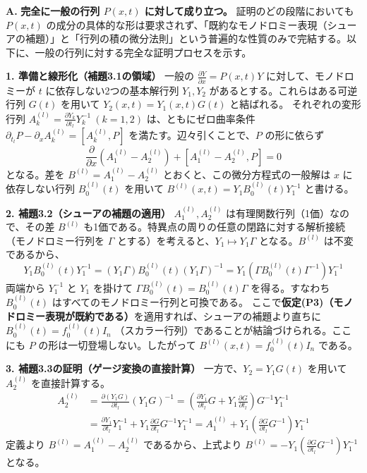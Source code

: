 \begin{Q}
\textbf{A.} \textbf{完全に一般の行列 $P(x,t)$ に対して成り立つ。}
証明のどの段階においても $P(x,t)$ の成分の具体的な形は要求されず、「既約なモノドロミー表現（シューアの補題）」と「行列の積の微分法則」という普遍的な性質のみで完結する。以下に、一般の行列に対する完全な証明プロセスを示す。

\textbf{1. 準備と線形化（補題3.1の領域）}
一般の $\frac{\partial Y}{\partial x} = P(x,t)Y$ に対して、モノドロミーが $t$ に依存しない2つの基本解行列 $Y_1, Y_2$ があるとする。これらはある可逆行列 $G(t)$ を用いて $Y_2(x,t) = Y_1(x,t)G(t)$ と結ばれる。
それぞれの変形行列 $A_k^{(l)} = \frac{\partial Y_k}{\partial t_l}Y_k^{-1} \ (k=1,2)$ は、ともにゼロ曲率条件 $\partial_{t_l} P - \partial_x A_k^{(l)} = [A_k^{(l)}, P]$ を満たす。辺々引くことで、$P$ の形に依らず
\[
  \frac{\partial}{\partial x}(A_1^{(l)} - A_2^{(l)}) + [A_1^{(l)} - A_2^{(l)}, P] = 0
\]
となる。差を $B^{(l)} = A_1^{(l)} - A_2^{(l)}$ とおくと、この微分方程式の一般解は $x$ に依存しない行列 $B_0^{(l)}(t)$ を用いて $B^{(l)}(x,t) = Y_1 B_0^{(l)}(t) Y_1^{-1}$ と書ける。

\textbf{2. 補題3.2（シューアの補題の適用）}%
$A_1^{(l)}, A_2^{(l)}$ は有理関数行列（1価）なので、その差 $B^{(l)}$ も1価である。特異点の周りの任意の閉路に対する解析接続（モノドロミー行列を $\Gamma$ とする）を考えると、$Y_1 \mapsto Y_1 \Gamma$ となる。$B^{(l)}$ は不変であるから、
\[
  Y_1 B_0^{(l)}(t) Y_1^{-1} = (Y_1 \Gamma) B_0^{(l)}(t) (Y_1 \Gamma)^{-1} = Y_1 (\Gamma B_0^{(l)}(t) \Gamma^{-1}) Y_1^{-1}
\]
両端から $Y_1^{-1}$ と $Y_1$ を掛けて $\Gamma B_0^{(l)}(t) = B_0^{(l)}(t) \Gamma$ を得る。すなわち $B_0^{(l)}(t)$ はすべてのモノドロミー行列と可換である。
ここで\textbf{仮定(P3)（モノドロミー表現が既約である）}を適用すれば、シューアの補題より直ちに $B_0^{(l)}(t) = f_0^{(l)}(t)I_n$ （スカラー行列）であることが結論づけられる。ここにも $P$ の形は一切登場しない。したがって $B^{(l)}(x,t) = f_0^{(l)}(t)I_n$ である。

\textbf{3. 補題3.3の証明（ゲージ変換の直接計算）}
一方で、$Y_2 = Y_1 G(t)$ を用いて $A_2^{(l)}$ を直接計算する。
\begin{align*}
  A_2^{(l)} &= \frac{\partial (Y_1 G)}{\partial t_l} (Y_1 G)^{-1} 
  = \left( \frac{\partial Y_1}{\partial t_l} G + Y_1 \frac{\partial G}{\partial t_l} \right) G^{-1} Y_1^{-1} \\
  &= \frac{\partial Y_1}{\partial t_l} Y_1^{-1} + Y_1 \frac{\partial G}{\partial t_l} G^{-1} Y_1^{-1} 
  = A_1^{(l)} + Y_1 \left( \frac{\partial G}{\partial t_l} G^{-1} \right) Y_1^{-1}
\end{align*}
定義より $B^{(l)} = A_1^{(l)} - A_2^{(l)}$ であるから、上式より $B^{(l)} = - Y_1 \left( \frac{\partial G}{\partial t_l} G^{-1} \right) Y_1^{-1}$ となる。


\end{Q}
